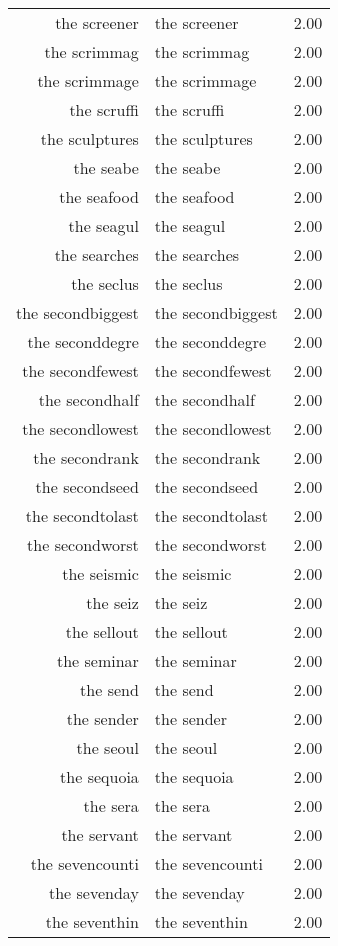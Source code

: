 \begin{table}[ht]
\begin{tabular}{rlr}
  the screener & the screener & 2.00 \\ 
  the scrimmag & the scrimmag & 2.00 \\ 
  the scrimmage & the scrimmage & 2.00 \\ 
  the scruffi & the scruffi & 2.00 \\ 
  the sculptures & the sculptures & 2.00 \\ 
  the seabe & the seabe & 2.00 \\ 
  the seafood & the seafood & 2.00 \\ 
  the seagul & the seagul & 2.00 \\ 
  the searches & the searches & 2.00 \\ 
  the seclus & the seclus & 2.00 \\ 
  the secondbiggest & the secondbiggest & 2.00 \\ 
  the seconddegre & the seconddegre & 2.00 \\ 
  the secondfewest & the secondfewest & 2.00 \\ 
  the secondhalf & the secondhalf & 2.00 \\ 
  the secondlowest & the secondlowest & 2.00 \\ 
  the secondrank & the secondrank & 2.00 \\ 
  the secondseed & the secondseed & 2.00 \\ 
  the secondtolast & the secondtolast & 2.00 \\ 
  the secondworst & the secondworst & 2.00 \\ 
  the seismic & the seismic & 2.00 \\ 
  the seiz & the seiz & 2.00 \\ 
  the sellout & the sellout & 2.00 \\ 
  the seminar & the seminar & 2.00 \\ 
  the send & the send & 2.00 \\ 
  the sender & the sender & 2.00 \\ 
  the seoul & the seoul & 2.00 \\ 
  the sequoia & the sequoia & 2.00 \\ 
  the sera & the sera & 2.00 \\ 
  the servant & the servant & 2.00 \\ 
  the sevencounti & the sevencounti & 2.00 \\ 
  the sevenday & the sevenday & 2.00 \\ 
  the seventhin & the seventhin & 2.00 \\ 

\end{tabular}
\end{table}
